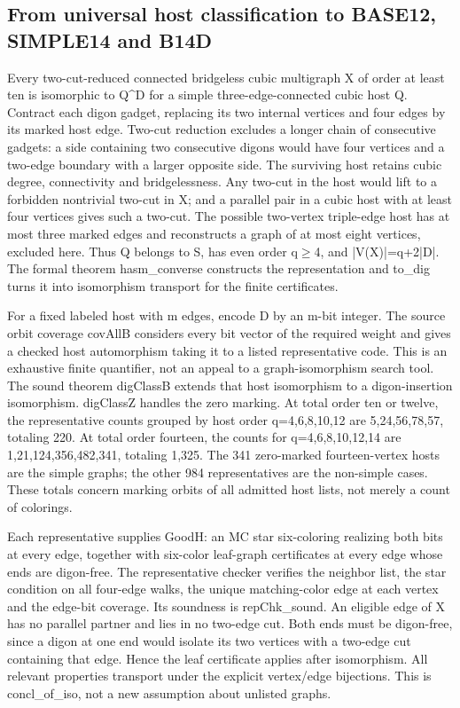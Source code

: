 \documentclass[11pt,a4paper]{article}
\begin{document}
\subsection{From universal host classification to BASE12, SIMPLE14 and B14D}
Every two-cut-reduced connected bridgeless cubic multigraph X of order at least ten is isomorphic to Q\textasciicircum{}D for a simple three-edge-connected cubic host Q. Contract each digon gadget, replacing its two internal vertices and four edges by its marked host edge. Two-cut reduction excludes a longer chain of consecutive gadgets: a side containing two consecutive digons would have four vertices and a two-edge boundary with a larger opposite side. The surviving host retains cubic degree, connectivity and bridgelessness. Any two-cut in the host would lift to a forbidden nontrivial two-cut in X; and a parallel pair in a cubic host with at least four vertices gives such a two-cut. The possible two-vertex triple-edge host has at most three marked edges and reconstructs a graph of at most eight vertices, excluded here. Thus Q belongs to S, has even order q\ensuremath{\geq}4, and |V(X)|=q+2|D|. The formal theorem hasm\_converse constructs the representation and to\_dig turns it into isomorphism transport for the finite certificates.

For a fixed labeled host with m edges, encode D by an m-bit integer. The source orbit coverage covAllB considers every bit vector of the required weight and gives a checked host automorphism taking it to a listed representative code. This is an exhaustive finite quantifier, not an appeal to a graph-isomorphism search tool. The sound theorem digClassB extends that host isomorphism to a digon-insertion isomorphism. digClassZ handles the zero marking. At total order ten or twelve, the representative counts grouped by host order q=4,6,8,10,12 are 5,24,56,78,57, totaling 220. At total order fourteen, the counts for q=4,6,8,10,12,14 are 1,21,124,356,482,341, totaling 1,325. The 341 zero-marked fourteen-vertex hosts are the simple graphs; the other 984 representatives are the non-simple cases. These totals concern marking orbits of all admitted host lists, not merely a count of colorings.

Each representative supplies GoodH: an MC star six-coloring realizing both bits at every edge, together with six-color leaf-graph certificates at every edge whose ends are digon-free. The representative checker verifies the neighbor list, the star condition on all four-edge walks, the unique matching-color edge at each vertex and the edge-bit coverage. Its soundness is repChk\_sound. An eligible edge of X has no parallel partner and lies in no two-edge cut. Both ends must be digon-free, since a digon at one end would isolate its two vertices with a two-edge cut containing that edge. Hence the leaf certificate applies after isomorphism. All relevant properties transport under the explicit vertex/edge bijections. This is concl\_of\_iso, not a new assumption about unlisted graphs.
\end{document}
